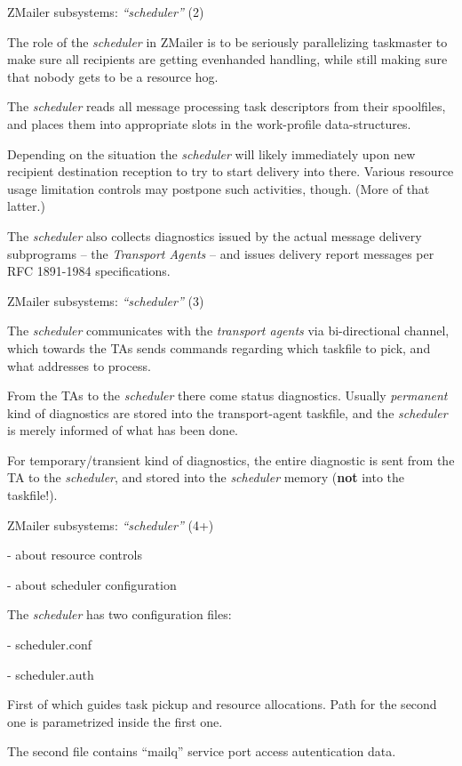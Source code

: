 \documentclass[a4paper,landscape]{slides}
\newcommand{\ZM}{ZMailer}
\begin{document}
\begin{slide}
\centerline{\large \ZM{} subsystems: {\em ``scheduler''} (2)}

\small
The role of the {\em scheduler} in \ZM{} is to be seriously parallelizing
taskmaster to make sure all recipients are getting evenhanded handling,
while still making sure that nobody gets to be a resource hog.

The {\em scheduler} reads all message processing task descriptors
from their spoolfiles, and places them into appropriate slots in
the work-profile data-structures.

Depending on the situation the {\em scheduler} will likely immediately
upon new recipient destination reception to try to start delivery into there.
Various resource usage limitation controls may postpone such activities,
though. (More of that latter.)

The {\em scheduler} also collects diagnostics issued by the actual
message delivery subprograms -- the {\em Transport Agents} -- and
issues delivery report messages per RFC 1891-1984 specifications.

\vfill
\end{slide}

\begin{slide}
\centerline{\large \ZM{} subsystems: {\em ``scheduler''} (3)}

The {\em scheduler} communicates with the {\em transport agents}
via bi-directional channel, which towards the TAs sends commands
regarding which taskfile to pick, and what addresses to process.

From the TAs to the {\em scheduler} there come status diagnostics.
Usually {\em permanent} kind of diagnostics are stored into the
transport-agent taskfile, and the {\em scheduler} is merely informed
of what has been done.

For temporary/transient kind of diagnostics, the entire diagnostic
is sent from the TA to the {\em scheduler}, and stored into the
{\em scheduler} memory ({\bf not} into the taskfile!).

\vfill
\end{slide}

\begin{slide}
\centerline{\large \ZM{} subsystems: {\em ``scheduler''} (4+)}

- about resource controls

- about scheduler configuration

The {\em scheduler} has two configuration files:

- scheduler.conf

- scheduler.auth

First of which guides task pickup and resource allocations.
Path for the second one is parametrized inside the first one.

The second file contains ``mailq'' service port access autentication
data.

\vfill
\end{slide}
\end{document}
